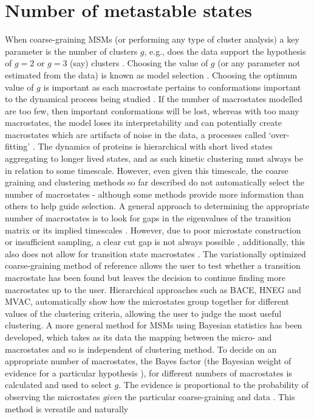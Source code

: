 \section{Number of metastable states}\label{sec:num_metastable}
When coarse-graining MSMs (or performing any type of cluster analysis) a key parameter is the number of clusters $g$, e.g., does the data support the hypothesis of $g=2$ or $g=3$ (say) clusters \cite{milliganExaminationProceduresDetermining1985}. Choosing the value of $g$ (or any parameter not estimated from the data) is known as model selection \cite[chapter 7]{friedman2001elements}. Choosing the optimum value of $g$ is important as each macrostate pertains to conformations important to the dynamical process being studied \cite{frauenfelderEnergyLandscapesMotions1991}. If the number of macrostates modelled are too few, then important conformations will be lost, whereas with too many macrostates, the model loses its interpretability and can potentially  create macrostates which are artifacts of noise in the data, a processes called `over-fitting' \cite[chapter 7]{friedman2001elements}. The dynamics of proteins is hierarchical \cite{frauenfelderEnergyLandscapesMotions1991} with short lived states aggregating to longer lived states, and as such kinetic clustering must always be in relation to some timescale. However, even given this timescale, the coarse graining and clustering methods so far described do not automatically select the number of macrostates - although some methods provide more information than others to help guide selection. A general approach to determining the appropriate number of macrostates is to look for gaps in the eigenvalues of the transition matrix or its implied timescales \cite{prinzMarkovModelsMolecular2011, mcgibbonVariationalCrossvalidationSlow2015, deuflhardIdentificationAlmostInvariant2000a}. However, due to poor microstate construction or insufficient sampling, a clear cut gap is not always possible \cite{bowmanQuantitativeComparisonAlternative2013}, additionally, this also does not allow for transition state macrostates \cite{martiniVariationalIdentificationMarkovian2017}. The variationally optimized coarse-graining method of reference \cite{martiniVariationalIdentificationMarkovian2017} allows the user to test whether a transition macrostate has been found but leaves the decision to continue finding more macrostates up to the user. Hierarchical approaches such as BACE,  HNEG and MVAC, automatically show how the microstates group together for different values of the clustering criteria, allowing the user to judge the most useful clustering.  A more general method for MSMs using Bayesian statistics has been developed, which takes as its data the mapping between the micro- and macrostates \cite{bacalladoBayesianComparisonMarkov2009a} and so is independent of clustering method. To decide on an appropriate number of macrostates, the Bayes factor (the Bayesian weight of evidence for a particular hypothesis \cite{kassBayesFactors1995}), for different numbers of macrostates is calculated and used to select $g$. The evidence is proportional to the probability of observing the microstates \emph{given} the particular coarse-graining and data \cite{bacalladoBayesianComparisonMarkov2009a}. This method is versatile and naturally 